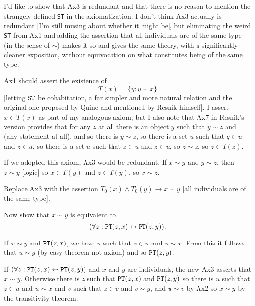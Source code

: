 \documentclass{slides}
\begin{document}
\begin{slide}

I'd like to show that Ax3 is redundant and that there is no reason to mention the strangely defined {\tt ST} in the axiomatization.  I don't think Ax3 actually is redundant [I'm still musing about whether it might be], but eliminating the weird {\tt ST}
from Ax1 and adding the assertion that all individuals are of the same type (in the sense of $\sim$) makes it so and gives the same theory, with a significantly cleaner exposition, without equivocation on what constitutes being of the same type.

Ax1 should assert the existence of $$T(x)=\{y:y \sim x\}$$ [letting ${\tt ST}$ be cohabitation, a far simpler and more natural relation and the original one proposed by Quine and mentioned by Resnik himself].   I assert $x \in T(x)$ as part of my analogous axiom;  but I also note
that Ax7 in Resnik's version provides that for any $z$ at all there is an object $y$ such that $y \sim z$ and (any statement at all), and so there is $y \sim z$, so there is a set $u$ such that $y \in u$ and $z \in u$, so there is
a set $u$ such that $z \in u$ and $z \in u$, so $z \sim z$, so $z \in T(z)$.

If we adopted this axiom, Ax3 would be redundant.  If $x \sim y$ and $y \sim z$, then $z \sim y$ [logic] so $x \in T(y)$ and $z \in T(y)$, so $x \sim z$.

Replace Ax3 with the assertion $T_0(x) \wedge T_0(y) \rightarrow x \sim y$ [all individuals are of the same type].

Now show that $x \sim y$ is equivalent to $$(\forall z:{\tt PT}(z,x) \leftrightarrow {\tt PT}(z,y)).$$

If $x \sim y$ and ${\tt PT}(z,x)$, we have $u$ such that $z \in u$ and $u \sim x$.  From this it follows that $u \sim y$ (by easy theorem not axiom) and so ${\tt PT}(z,y)$.

If $(\forall z:{\tt PT}(z,x) \leftrightarrow {\tt PT}(z,y))$ and $x$ and $y$ are individuals, the new Ax3 asserts that $x \sim y$.  Otherwise there is $z$ such that ${\tt PT}(z,x)$ and ${\tt PT}(z,y)$ so there is $u$ such that $z \in u$ and $u \sim x$ and $v$ such that $z \in v$ and $v \sim y$,
and $u \sim v$ by Ax2 so $x \sim y$ by the transitivity theorem.


\end{slide}
\end{document}
